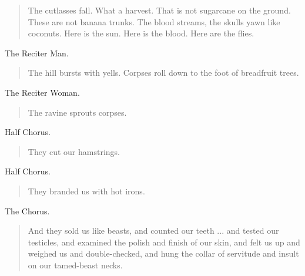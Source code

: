 \documentclass[letterpaper,article,12pt,oneside,notitlepage]{memoir}
\begin{document}
\begin{verse}
\indent The cutlasses fall. What a harvest. That is not sugarcane on the ground. These are not banana trunks. The blood streams, the skulls yawn like coconuts. Here is the sun. Here is the blood. Here are the flies. \\
\end{verse}

\begin{center}The Reciter Man.\end{center}

\begin{verse}
\indent The hill bursts with yells. Corpses roll down to the foot of breadfruit trees. \\
\end{verse}

\begin{center}The Reciter Woman.\end{center}

\begin{verse}
\hspace{1cm} The ravine sprouts corpses. \\
\end{verse}

\begin{center}Half Chorus.\end{center}

\begin{verse}
\hspace{1cm} They cut our hamstrings. \\
\end{verse}

\clearpage

\begin{center}Half Chorus.\end{center}

\begin{verse}
\hspace{1cm} They branded us with hot irons. \\
\end{verse}

\begin{center}The Chorus.\end{center}

\begin{verse}
\indent And they sold us like beasts, and counted our teeth ... and tested our testicles, and examined the polish and finish of our skin, and felt us up and weighed us and double-checked, and hung the collar of servitude and insult on our tamed-beast necks. \\
\end{verse}
\end{document}
